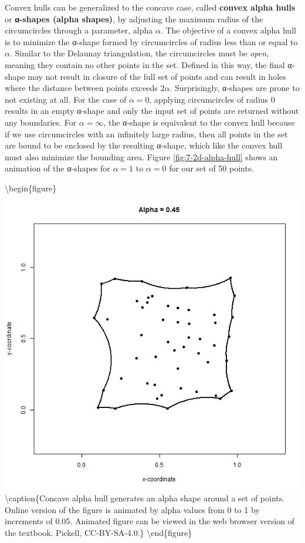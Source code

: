 \documentclass[
]{book}
\begin{document}
Convex hulls can be generalized to the concave case, called \textbf{convex alpha hulls} or \textbf{α-shapes (alpha shapes)}, by adjusting the maximum radius of the circumcircles through a parameter, alpha \(α\). The objective of a convex alpha hull is to minimize the α-shape formed by circumcircles of radius less than or equal to \(α\). Similar to the Delaunay triangulation, the circumcircles must be \emph{open}, meaning they contain no other points in the set. Defined in this way, the final α-shape may not result in closure of the full set of points and can result in holes where the distance between points exceeds \(2α\). Surprisingly, α-shapes are prone to not existing at all. For the case of \(α=0\), applying circumcircles of radius 0 results in an empty α-shape and only the input set of points are returned without any boundaries. For \(α=∞\), the α-shape is equivalent to the convex hull because if we use circumcircles with an infinitely large radius, then all points in the set are bound to be enclosed by the resulting α-shape, which like the convex hull must also minimize the bounding area. Figure \ref{fig:7-2d-alpha-hull} shows an animation of the α-shapes for \(α=1\) to \(α=0\) for our set of 50 points.

\textbackslash begin\{figure\}
\includegraphics[width=0.75\linewidth]{images/07-2d-alpha-hull} \textbackslash caption\{Concave alpha hull generates an alpha shape around a set of points. Online version of the figure is animated by alpha values from 0 to 1 by increments of 0.05. Animated figure can be viewed in the web browser version of the textbook. Pickell, CC-BY-SA-4.0.\}\label{fig:7-2d-alpha-hull}
\textbackslash end\{figure\}
\end{document}
